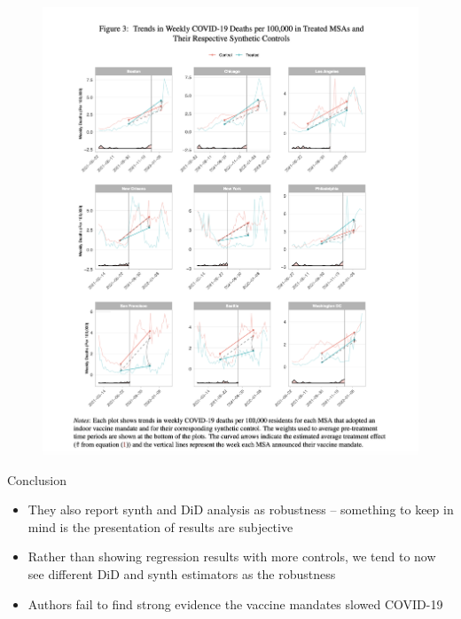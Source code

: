 \documentclass{beamer}
\begin{document}
\begin{frame}[plain]

	\begin{figure}
	\includegraphics[scale=0.3]{./lecture_includes/vitor_figure3}
	\end{figure}

\end{frame}


\begin{frame}{Conclusion}

\begin{itemize}

\item They also report synth and DiD analysis as robustness -- something to keep in mind is the presentation of results are subjective
\item Rather than showing regression results with more controls, we tend to now see different DiD and synth estimators as the robustness
\item Authors fail to find strong evidence the vaccine mandates slowed COVID-19

\end{itemize}

\end{frame}
\end{document}

